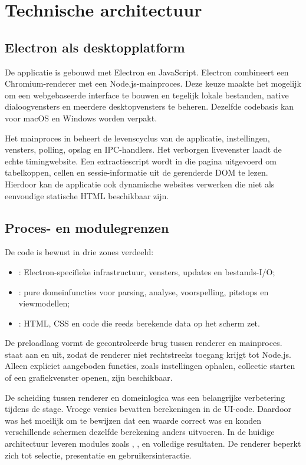 \chapter{Technische architectuur}
\label{chap:architectuur}

\section{Electron als desktopplatform}
De applicatie is gebouwd met Electron en JavaScript. Electron combineert een Chromium-renderer met een Node.js-mainproces. Deze keuze maakte het mogelijk om een webgebaseerde interface te bouwen en tegelijk lokale bestanden, native dialoogvensters en meerdere desktopvensters te beheren. Dezelfde codebasis kan voor macOS en Windows worden verpakt.

Het mainproces in  beheert de levenscyclus van de applicatie, instellingen, vensters, polling, opslag en IPC-handlers. Het verborgen livevenster laadt de echte timingwebsite. Een extractiescript wordt in die pagina uitgevoerd om tabelkoppen, cellen en sessie-informatie uit de gerenderde DOM te lezen. Hierdoor kan de applicatie ook dynamische websites verwerken die niet als eenvoudige statische HTML beschikbaar zijn.

\section{Proces- en modulegrenzen}
De code is bewust in drie zones verdeeld:

\begin{itemize}
  \item {}: Electron-specifieke infrastructuur, vensters, updates en bestands-I/O;
  \item {}: pure domeinfuncties voor parsing, analyse, voorspelling, pitstops en viewmodellen;
  \item {}: HTML, CSS en code die reeds berekende data op het scherm zet.
\end{itemize}

De preloadlaag vormt de gecontroleerde brug tussen renderer en mainproces.  staat aan en  uit, zodat de renderer niet rechtstreeks toegang krijgt tot Node.js. Alleen expliciet aangeboden functies, zoals instellingen ophalen, collectie starten of een grafiekvenster openen, zijn beschikbaar.

De scheiding tussen renderer en domeinlogica was een belangrijke verbetering tijdens de stage. Vroege versies bevatten berekeningen in de UI-code. Daardoor was het moeilijk om te bewijzen dat een waarde correct was en konden verschillende schermen dezelfde berekening anders uitvoeren. In de huidige architectuur leveren modules zoals , ,  en  volledige resultaten. De renderer beperkt zich tot selectie, presentatie en gebruikersinteractie.

